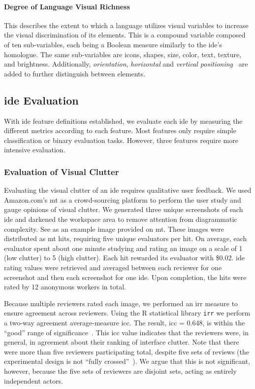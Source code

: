 \paragraph{Degree of Language Visual Richness}
This describes the extent to which a language utilizes visual variables to increase the visual discrimination of its elements.
This is a compound variable composed of ten sub-variables, each being a Boolean measure similarly to the \ac{ide}'s homologue.
The same sub-variables are icons, shapes, size, color, text, texture, and brightness.
Additionally, \emph{orientation}, \emph{horizontal} and \emph{vertical positioning}~\cite{moody2009} are added to further distinguish between elements.


\subsection{\acs{ide} Evaluation} \label{subsec:ideevaluation}

With \ac{ide} feature definitions established, we evaluate each \ac{ide} by measuring the different metrics according to each feature.
Most features only require simple classification or binary evaluation tasks.
However, three features require more intensive evaluation.


\subsubsection{Evaluation of Visual Clutter} \label{subsubsec:mturk}

Evaluating the visual clutter of an \ac{ide} requires qualitative user feedback.
We used Amazon.com's \ac{mt} as a crowd-sourcing platform to perform the user study and gauge opinions of visual clutter.
We generated three unique screenshots of each \ac{ide} and darkened the
workspace area to remove attention from diagrammatic complexity. See
 as an example image provided on \ac{mt}.
These images were distributed as \ac{mt} \acp{hit}, requiring five unique evaluators per \ac{hit}.
On average, each evaluator spent about one minute studying and rating an image on a scale of 1 (low clutter) to 5 (high clutter).
Each \ac{hit} rewarded its evaluator with \$0.02.
\ac{ide} rating values were retrieved and averaged between each reviewer for one screenshot and then each screenshot for one \ac{ide}.
Upon completion, the \acp{hit} were rated by 12 anonymous workers in total.

Because multiple reviewers rated each image, we performed an \ac{irr} measure to ensure agreement across reviewers.
Using the R statistical library \texttt{irr} we perform a two-way agreement average-measure \ac{icc}.
The result, \ac{icc} = 0.648, is within the ``good'' range of significance~\cite{cicchetti1994,hallgren2012}.
This \ac{icc} value indicates that the reviewers were, in general, in agreement about their ranking of interface clutter.
Note that there were more than five reviewers participating total, despite five sets of reviews (\ie the experimental design is not ``fully crossed''~\cite{hallgren2012}).
We argue that this is not significant, however, because the five sets of reviewers are disjoint sets, acting as entirely independent actors.

